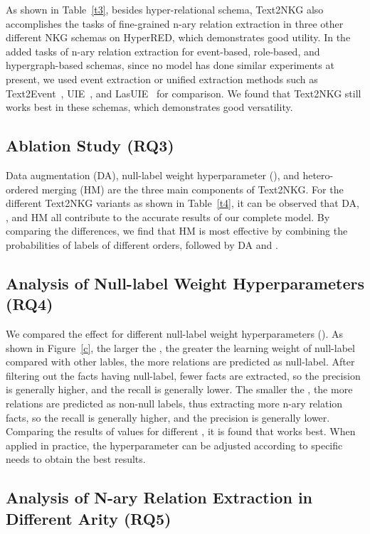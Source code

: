 \documentclass{article} \usepackage{iclr2024_conference,times}
\begin{document}
As shown in Table~\ref{t3}, besides hyper-relational schema, Text2NKG also accomplishes the tasks of fine-grained n-ary relation extraction in three other different NKG schemas on HyperRED, which demonstrates good utility. In the added tasks of n-ary relation extraction for event-based, role-based, and hypergraph-based schemas, since no model has done similar experiments at present, we used event extraction or unified extraction methods such as Text2Event~\citep{Text2Event}, UIE~\citep{UIE}, and LasUIE~\citep{LasUIE} for comparison. We found that Text2NKG still works best in these schemas, which demonstrates good versatility.


\subsection{Ablation Study (RQ3)}

Data augmentation (DA), null-label weight hyperparameter (), and hetero-ordered merging (HM) are the three main components of Text2NKG. For the different Text2NKG variants as shown in Table~\ref{t4}, it can be observed that DA, , and HM all contribute to the accurate results of our complete model. By comparing the differences, we find that HM is most effective by combining the probabilities of labels of different orders, followed by DA and .



\subsection{Analysis of Null-label Weight Hyperparameters (RQ4)}

We compared the effect for different null-label weight hyperparameters (). As shown in Figure~\ref{c}, the larger the , the greater the learning weight of null-label compared with other lables, the more relations are predicted as null-label. After filtering out the facts having null-label, fewer facts are extracted, so the precision is generally higher, and the recall is generally lower. The smaller the , the more relations are predicted as non-null labels, thus extracting more n-ary relation facts, so the recall is generally higher, and the precision is generally lower. Comparing the results of  values for different , it is found that  works best. When applied in practice, the hyperparameter  can be adjusted according to specific needs to obtain the best results. 



\subsection{Analysis of N-ary Relation Extraction in Different Arity (RQ5)}
\end{document}
